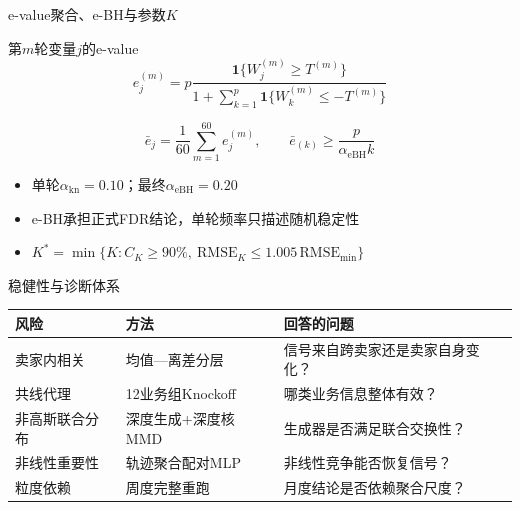 \documentclass[aspectratio=169]{beamer}
\begin{document}
\begin{frame}[shrink=10]{e-value聚合、e-BH与参数$K$}
  \begin{block}{第$m$轮变量$j$的e-value}
    \begin{equation*}
      e_j^{(m)}
      =p\frac{\mathbf 1\{W_j^{(m)}\ge T^{(m)}\}}
      {1+\sum_{k=1}^{p}\mathbf 1\{W_k^{(m)}\le-T^{(m)}\}}
    \end{equation*}
  \end{block}
  \begin{equation*}
    \bar e_j=\frac{1}{60}\sum_{m=1}^{60}e_j^{(m)},\qquad
    \bar e_{(k)}\ge\frac{p}{\alpha_{\mathrm{eBH}}k}
  \end{equation*}
  \begin{itemize}
    \item 单轮$\alpha_{\mathrm{kn}}=0.10$；最终$\alpha_{\mathrm{eBH}}=0.20$
    \item e-BH承担正式FDR结论，单轮频率只描述随机稳定性
    \item $K^*=\min\{K:C_K\ge90\%,\ \mathrm{RMSE}_K\le1.005\,\mathrm{RMSE}_{\min}\}$
  \end{itemize}
\end{frame}

\begin{frame}{稳健性与诊断体系}
  \begin{table}
    \centering
    \small
    \begin{tabular}{p{}p{}p{}}
      \toprule
      风险 & 方法 & 回答的问题 \\
      \midrule
      卖家内相关 & 均值—离差分层 & 信号来自跨卖家还是卖家自身变化？ \\
      共线代理 & 12业务组Knockoff & 哪类业务信息整体有效？ \\
      非高斯联合分布 & 深度生成+深度核MMD & 生成器是否满足联合交换性？ \\
      非线性重要性 & 轨迹聚合配对MLP & 非线性竞争能否恢复信号？ \\
      粒度依赖 & 周度完整重跑 & 月度结论是否依赖聚合尺度？ \\
      \bottomrule
    \end{tabular}
  \end{table}
\end{frame}
\end{document}
